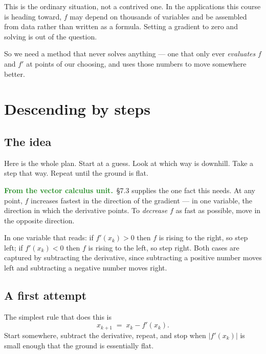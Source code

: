 \documentclass[11pt]{article}
\theoremstyle{plain}
\theoremstyle{definition}
\theoremstyle{remark}
\newcommand{\lookback}{\par\smallskip\noindent
  \textbf{\sffamily\textcolor{ForestGreen}{From the vector calculus unit.}}\ \ignorespaces}
\begin{document}
This is the ordinary situation, not a contrived one. In the applications this
course is heading toward, $f$ may depend on thousands of variables and be
assembled from data rather than written as a formula. Setting a gradient to zero
and solving is out of the question.

So we need a method that never solves anything --- one that only ever
\emph{evaluates} $f$ and $f'$ at points of our choosing, and uses those numbers
to move somewhere better.

\section{Descending by steps}

\subsection{The idea}
Here is the whole plan. Start at a guess. Look at which way is downhill. Take a
step that way. Repeat until the ground is flat.

\lookback \S7.3 supplies the one fact this needs. At any point, $f$ increases
fastest in the direction of the gradient --- in one variable, the direction in
which the derivative points. To \emph{decrease} $f$ as fast as possible, move in
the opposite direction.

In one variable that reads: if $f'(x_k)>0$ then $f$ is rising to the right, so
step left; if $f'(x_k)<0$ then $f$ is rising to the left, so step right. Both
cases are captured by subtracting the derivative, since subtracting a positive
number moves left and subtracting a negative number moves right.

\subsection{A first attempt}
The simplest rule that does this is
\begin{equation}\label{eq:naive}
  x_{k+1} \;=\; x_k - f'(x_k) .
\end{equation}
Start somewhere, subtract the derivative, repeat, and stop when $|f'(x_k)|$ is
small enough that the ground is essentially flat.
\end{document}

